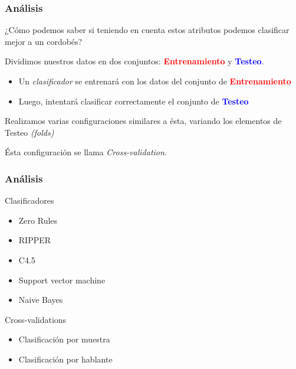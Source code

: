 \documentclass[mathserif]{beamer}%
\begin{document}
\begin{frame}
	\frametitle{Análisis}
	
	\begin{center}
		\Large {¿Cómo podemos saber si teniendo en cuenta estos atributos podemos clasificar mejor a un cordobés?}
		
	\end{center}
	
	\pause
	
	Dividimos nuestros datos en dos conjuntos: \textcolor{red}{\textbf{Entrenamiento}} y \textcolor{blue}{\textbf{Testeo}}.
	
	\begin{itemize}
		\item Un \textit{clasificador} se entrenará con los datos del conjunto de \textcolor{red}{\textbf{Entrenamiento}}
		\item Luego, intentará clasificar correctamente el conjunto de \textcolor{blue}{\textbf{Testeo}}
	\end{itemize}
	
	Realizamos varias configuraciones similares a ésta, variando los elementos de Testeo \textit{(folds)}
	
	Ésta configuración se llama \textit{Cross-validation}.

\end{frame}

\begin{frame}
	\frametitle{Análisis}

	\Large {Clasificadores}
	\begin{itemize}
		\item Zero Rules
		\item RIPPER
		\item C4.5
		\item Support vector machine
		\item Naive Bayes
	\end{itemize}
	
	\Large {Cross-validations}
	\begin{itemize}
		\item Clasificación por muestra 
		\item Clasificación por hablante
	\end{itemize}
	
\end{frame}
\end{document}
